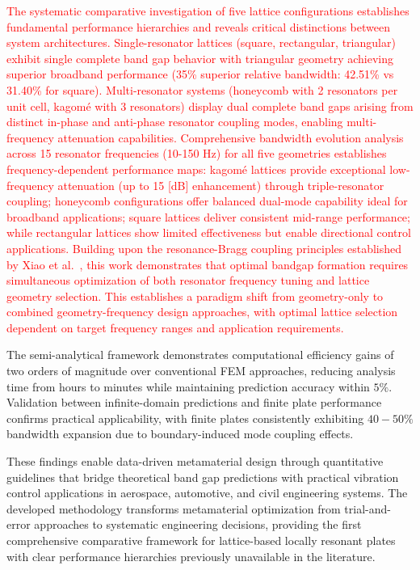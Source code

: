\documentclass[review,numbers,sort&compress]{elsarticle}
\begin{document}
\textcolor{red}{The systematic comparative investigation of five lattice configurations establishes fundamental performance hierarchies and reveals critical distinctions between system architectures. Single-resonator lattices (square, rectangular, triangular) exhibit single complete band gap behavior with triangular geometry achieving superior broadband performance (35\% superior relative bandwidth: 42.51\% vs 31.40\% for square). Multi-resonator systems (honeycomb with 2 resonators per unit cell, kagomé with 3 resonators) display dual complete band gaps arising from distinct in-phase and anti-phase resonator coupling modes, enabling multi-frequency attenuation capabilities. Comprehensive bandwidth evolution analysis across 15 resonator frequencies (10-150 Hz) for all five geometries establishes frequency-dependent performance maps: kagomé lattices provide exceptional low-frequency attenuation (up to 15 [dB] enhancement) through triple-resonator coupling; honeycomb configurations offer balanced dual-mode capability ideal for broadband applications; square lattices deliver consistent mid-range performance; while rectangular lattices show limited effectiveness but enable directional control applications. Building upon the resonance-Bragg coupling principles established by Xiao et al.~\cite{Xiao_2012}, this work demonstrates that optimal bandgap formation requires simultaneous optimization of both resonator frequency tuning and lattice geometry selection. This establishes a paradigm shift from geometry-only to combined geometry-frequency design approaches, with optimal lattice selection dependent on target frequency ranges and application requirements.}

The semi-analytical framework demonstrates computational efficiency gains of two orders of magnitude over conventional FEM approaches, reducing analysis time from hours to minutes while maintaining prediction accuracy within $5\%$. Validation between infinite-domain predictions and finite plate performance confirms practical applicability, with finite plates consistently exhibiting $40-50\%$ bandwidth expansion due to boundary-induced mode coupling effects.

These findings enable data-driven metamaterial design through quantitative guidelines that bridge theoretical band gap predictions with practical vibration control applications in aerospace, automotive, and civil engineering systems. The developed methodology transforms metamaterial optimization from trial-and-error approaches to systematic engineering decisions, providing the first comprehensive comparative framework for lattice-based locally resonant plates with clear performance hierarchies previously unavailable in the literature.
\end{document}
